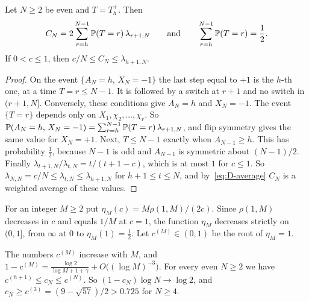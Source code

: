 \begin{lemma}\label{lem:D-average}
Let $N\ge2$ be even and $T=T^+_h$. Then
\begin{equation}\label{eq:D-average}
C_N=2\sum_{r=h}^{N-1}\mathbb{P}(T=r)\,\lambda_{r+1,N}\qquad\text{and}\qquad
\sum_{r=h}^{N-1}\mathbb{P}(T=r)=\frac12 .
\end{equation}
If $0<c\le1$, then $c/N\le C_N\le\lambda_{h+1,N}$.
\end{lemma}

\begin{proof}
On the event $\{A_N=h,\,X_N=-1\}$ the last step equal to $+1$ is the $h$-th
one, at a time $T=r\le N-1$. It is followed by a switch at $r+1$ and no switch
in $(r+1,N]$. Conversely, these conditions give $A_N=h$ and $X_N=-1$. The
event $\{T=r\}$ depends only on $X_1,\chi_2,\dots,\chi_r$. So
$\mathbb{P}(A_N=h,\,X_N=-1)=\sum_{r=h}^{N-1}\mathbb{P}(T=r)\,\lambda_{r+1,N}$, and flip
symmetry gives the same value for $X_N=+1$. Next, $T\le N-1$ exactly when
$A_{N-1}\ge h$. This has probability $\frac12$, because $N-1$ is odd and
$A_{N-1}$ is symmetric about $(N-1)/2$. Finally
$\lambda_{t+1,N}/\lambda_{t,N}=t/(t+1-c)$, which is at most $1$ for $c\le1$.
So $\lambda_{N,N}=c/N\le\lambda_{t,N}\le\lambda_{h+1,N}$ for
$h+1\le t\le N$, and by~\eqref{eq:D-average} $C_N$ is a weighted average of
these values.
\end{proof}

For an integer $M\ge2$ put $\eta_M(c)=M\rho(1,M)/(2c)$. Since $\rho(1,M)$
decreases in $c$ and equals $1/M$ at $c=1$, the function $\eta_M$ decreases
strictly on $(0,1]$, from $\infty$ at $0$ to $\eta_M(1)=\frac12$. Let
$c^{(M)}\in(0,1)$ be the root of $\eta_M=1$.

\begin{proposition}[bracket]\label{prop:D-bracket}
The numbers $c^{(M)}$ increase with $M$, and
$1-c^{(M)}=\frac{\log2}{\log M+1+\gamma}+O\bigl((\log M)^{-3}\bigr)$. For
every even $N\ge2$ we have $c^{(h+1)}\le c_N\le c^{(N)}$. So
$(1-c_N)\log N\to\log2$, and $c_N\ge c^{(3)}=(9-\sqrt{57})/2>0.725$ for
$N\ge4$.
\end{proposition}

